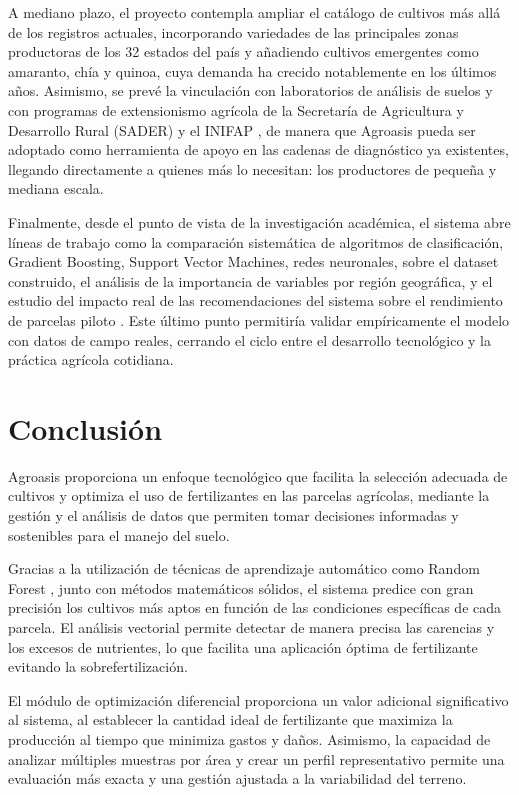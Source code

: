 \documentclass[12pt]{article}
\begin{document}
A mediano plazo, el proyecto contempla ampliar el catálogo de cultivos más allá de los registros actuales, incorporando variedades de las principales zonas productoras de los 32 estados del país y añadiendo cultivos emergentes como amaranto, chía y quinoa, cuya demanda ha crecido notablemente en los últimos años. Asimismo, se prevé la vinculación con laboratorios de análisis de suelos y con programas de extensionismo agrícola de la Secretaría de Agricultura y Desarrollo Rural (SADER) y el INIFAP \citep{sader_2020}, de manera que Agroasis pueda ser adoptado como herramienta de apoyo en las cadenas de diagnóstico ya existentes, llegando directamente a quienes más lo necesitan: los productores de pequeña y mediana escala.

Finalmente, desde el punto de vista de la investigación académica, el sistema abre líneas de trabajo como la comparación sistemática de algoritmos de clasificación, Gradient Boosting, Support Vector Machines, redes neuronales, sobre el dataset construido, el análisis de la importancia de variables por región geográfica, y el estudio del impacto real de las recomendaciones del sistema sobre el rendimiento de parcelas piloto \citep{sharma_2021}. Este último punto permitiría validar empíricamente el modelo con datos de campo reales, cerrando el ciclo entre el desarrollo tecnológico y la práctica agrícola cotidiana.

\newpage
\section{Conclusión}

Agroasis proporciona un enfoque tecnológico que facilita la selección adecuada de cultivos y optimiza el uso de fertilizantes en las parcelas agrícolas, mediante la gestión y el análisis de datos que permiten tomar decisiones informadas y sostenibles para el manejo del suelo.

Gracias a la utilización de técnicas de aprendizaje automático como Random Forest \citep{breiman_2001}, junto con métodos matemáticos sólidos, el sistema predice con gran precisión los cultivos más aptos en función de las condiciones específicas de cada parcela. El análisis vectorial permite detectar de manera precisa las carencias y los excesos de nutrientes, lo que facilita una aplicación óptima de fertilizante evitando la sobrefertilización.

El módulo de optimización diferencial proporciona un valor adicional significativo al sistema, al establecer la cantidad ideal de fertilizante que maximiza la producción al tiempo que minimiza gastos y daños. Asimismo, la capacidad de analizar múltiples muestras por área y crear un perfil representativo permite una evaluación más exacta y una gestión ajustada a la variabilidad del terreno.
\end{document}
